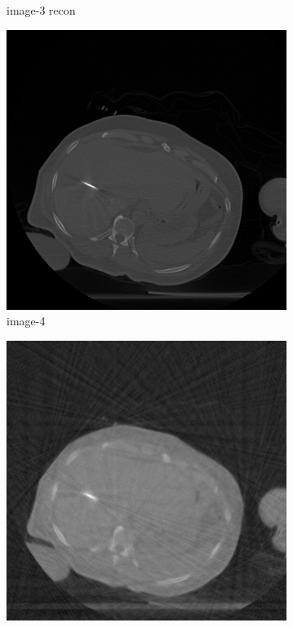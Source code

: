 \documentclass[journal]{IEEEtran}
\begin{document}
\begin{figure}[!h]
\begin{subfigure}[b]{0.24\linewidth}
\captionsetup{labelformat=empty}       
 \caption{image-3 recon}
    \end{subfigure}
 \begin{subfigure}[b]{0.24\linewidth}
        \includegraphics[width=\textwidth]{../images/tmh/RFA2/template4.png}
\captionsetup{labelformat=empty}       
 \caption{image-4}
    \end{subfigure}
       \begin{subfigure}[b]{0.24\linewidth}
        \includegraphics[width=\textwidth]{../images/tmh/RFA2/new_protocol/result_image_4.png}

\end{subfigure}
\end{figure}
\end{document}
